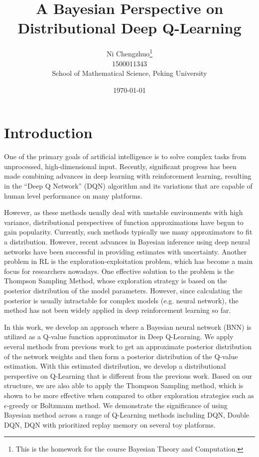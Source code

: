 \documentclass[a4paper,12pt]{article}
\title{A Bayesian Perspective on Distributional Deep Q-Learning}
\date{\today}
\author{Ni Chengzhuo\footnote{This is the homework for the course Bayesian Theory and Computation.}\\
1500011343\\
School of Mathematical Science, Peking University\\
}
\begin{document}
\maketitle


\section{Introduction}
One of the primary goals of artificial intelligence is to solve complex tasks from unprocessed, high-dimensional input. Recently, significant progress has been made combining advances in deep learning with reinforcement learning, resulting in the ``Deep Q Network'' (DQN)\cite{DQN} algorithm and its variations\cite{DDQN, PDQN, DuelDQN} that are capable of human level performance on many platforms. 

However, as these methods usually deal with unstable environments with high variance, distributional perspectives of function approximations have begun to gain popularity.  Currently, such methods typically use many approximators to fit a distribution\cite{DisDQN, BDQN}. However, recent advances in Bayesian inference using deep neural networks have been successful in providing estimates with uncertainty\cite{Dropout, BNN, BNN2, BNN3}. Another problem in RL is the exploration-exploitation problem, which has become a main focus for researchers nowadays. One effective solution to the problem is the Thompson Sampling Method\cite{TS, TS2, TS3}, whose exploration strategy is based on the posterior distribution of the model parameters. However, since calculating the posterior is usually intractable for complex models (e.g. neural network), the method has not been widely applied in deep reinforcement learning so far.

In this work, we develop an approach where a Bayesian neural network (BNN) is utilized as a Q-value function approximator in Deep Q-Learning. We apply several methods\cite{BNN, Dropout} from previous work to get an approximate posterior distribution of the network weights and then form a posterior distribution of the Q-value estimation. With this estimated distribution, we develop a distributional perspective on Q-Learning that is different from the previous work\cite{DisDQN}. Based on our structure, we are also able to apply the Thompson Sampling method, which is shown to be more effective when compared to other exploration strategies such as $\epsilon$-greedy or Boltzmann method. We demonstrate the significance of using Bayesian method across a range of Q-Learning methods including DQN, Double DQN, DQN with prioritized replay memory on several toy platforms.  
\end{document}
